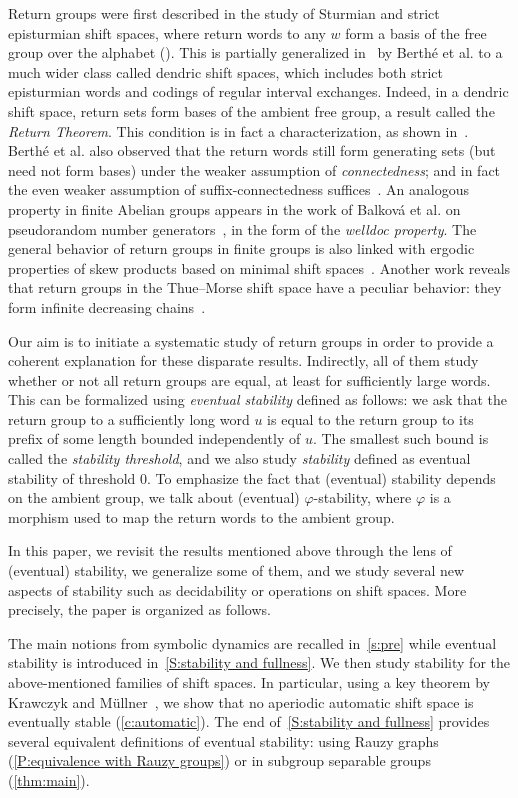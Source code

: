 \documentclass{amsart}
\theoremstyle{plain}
\theoremstyle{definition}
\theoremstyle{remark}
\begin{document}
Return groups were first described in the study of Sturmian and strict episturmian shift spaces, where return words to any $w$ form a basis of the free group over the alphabet (\cite{Justin2000,Berstel2012}). This is partially generalized in~\cite{Berthe2015} by Berthé et al. to a much wider class called dendric shift spaces, which includes both strict episturmian words and codings of regular interval exchanges. Indeed, in a dendric shift space, return sets form bases of the ambient free group, a result called the \emph{Return Theorem}. This condition is in fact a characterization, as shown in~\cite{pre/Gheeraert2024}. Berthé et al. also observed that the return words still form generating sets (but need not form bases) under the weaker assumption of \emph{connectedness}; and in fact the even weaker assumption of suffix-connectedness suffices~\cite{Goulet-Ouellet2022}. 
An analogous property in finite Abelian groups appears in the work of Balková et al. on pseudorandom number generators~\cite{Balkova2016}, in the form of the \emph{welldoc property}. The general behavior of return groups in finite groups is also linked with ergodic properties of skew products based on minimal shift spaces~\cite{pre/Berthe2024}. Another work reveals that return groups in the Thue--Morse shift space have a peculiar behavior: they form infinite decreasing chains~\cite{Berthe2023}.

Our aim is to initiate a systematic study of return groups in order to provide a coherent explanation for these disparate results. Indirectly, all of them study whether or not all return groups are equal, at least for sufficiently large words. This can be formalized using \emph{eventual stability} defined as follows: we ask that the return group to a sufficiently long word $u$ is equal to the return group to its prefix of some length bounded independently of $u$. The smallest such bound is called the \emph{stability threshold}, and we also study \emph{stability} defined as eventual stability of threshold 0. To emphasize the fact that (eventual) stability depends on the ambient group, we talk about (eventual) $\varphi$-stability, where $\varphi$ is a morphism used to map the return words to the ambient group.

In this paper, we revisit the results mentioned above through the lens of (eventual) stability, we generalize some of them, and we study several new aspects of stability such as decidability or operations on shift spaces. More precisely, the paper is organized as follows.

The main notions from symbolic dynamics are recalled in~\cref{s:pre} while eventual stability is introduced in~\cref{S:stability and fullness}. We then study stability for the above-mentioned families of shift spaces. In particular, using a key theorem by Krawczyk and Müllner~\cite{these_Krawczyk}, we show that no aperiodic automatic shift space is eventually stable (\cref{c:automatic}). The end of~\cref{S:stability and fullness} provides several equivalent definitions of eventual stability: using Rauzy graphs (\cref{P:equivalence with Rauzy groups}) or in subgroup separable groups (\cref{thm:main}).
\end{document}
